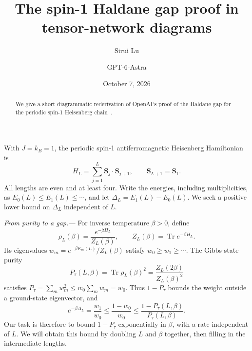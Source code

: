 \documentclass[aps,prl,reprint,amsmath,amssymb,nofootinbib,raggedbottom]{revtex4-2}
\newcommand{\Tr}{\operatorname{Tr}}
\newcommand{\Pt}{P_{\tau}}
\begin{document}
\title{The spin-1 Haldane gap proof in tensor-network diagrams}
\author{Sirui Lu}
\author{GPT-6-Astra}
\date{October 7, 2026}
\begin{abstract}
We give a short diagrammatic rederivation of OpenAI's proof of the
Haldane gap for the periodic spin-1 Heisenberg chain~\cite{source}.
\end{abstract}
\maketitle
\setlength{\abovedisplayskip}{5pt plus 2pt minus 1pt}
\setlength{\belowdisplayskip}{5pt plus 2pt minus 1pt}

With $J=k_B=1$, the periodic spin-1 antiferromagnetic Heisenberg
Hamiltonian is
\begin{equation}
 H_L=\sum_{j=1}^L\bm S_j\cdot\bm S_{j+1},\qquad
 \bm S_{L+1}=\bm S_1.
 \label{eq:model}
\end{equation}
All lengths are even and at least four. Write the energies, including
multiplicities, as $E_0(L)\le E_1(L)\le\cdots$, and let
$\Delta_L=E_1(L)-E_0(L)$. We seek a positive lower bound on $\Delta_L$
independent of $L$.

\emph{From purity to a gap.---}
For inverse temperature $\beta>0$, define
\begin{equation}
 \rho_L(\beta)=\frac{e^{-\beta H_L}}{Z_L(\beta)},\qquad
 Z_L(\beta)=\Tr e^{-\beta H_L}.
 \label{eq:gibbs}
\end{equation}
Its eigenvalues $w_m=e^{-\beta E_m(L)}/Z_L(\beta)$ satisfy
$w_0\ge w_1\ge\cdots$. The Gibbs-state purity
\begin{equation}
 \Pt(L,\beta)=\Tr\rho_L(\beta)^2
 =\frac{Z_L(2\beta)}{Z_L(\beta)^2}
 \label{eq:thermalpurity}
\end{equation}
satisfies $\Pt=\sum_m w_m^2\le w_0\sum_m w_m=w_0$.
Thus $1-\Pt$ bounds the weight outside a ground-state eigenvector, and
\begin{equation}
 e^{-\beta\Delta_L}=\frac{w_1}{w_0}
 \le\frac{1-w_0}{w_0}\le\frac{1-\Pt(L,\beta)}{\Pt(L,\beta)}.
 \label{eq:target}
\end{equation}
Our task is therefore to bound $1-\Pt$ exponentially in $\beta$, with a
rate independent of $L$. We will obtain this bound by doubling $L$ and
$\beta$ together, then filling in the intermediate lengths.
\end{document}
